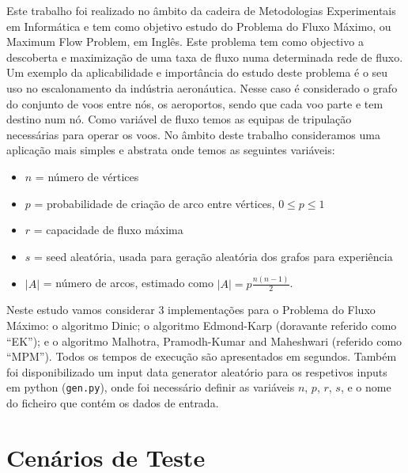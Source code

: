 \documentclass{uofa-eng-assignment}
\begin{document}
Este trabalho foi realizado no âmbito da cadeira de Metodologias Experimentais em Informática e tem como objetivo estudo do Problema do Fluxo Máximo, ou Maximum Flow Problem, em Inglês. Este problema tem como objectivo a descoberta e maximização de uma taxa de fluxo numa determinada rede de fluxo. Um exemplo da aplicabilidade e importância do estudo deste problema é o seu uso no escalonamento da indústria aeronáutica. Nesse caso é considerado o grafo do conjunto de voos entre nós, os aeroportos, sendo que cada voo parte e tem destino num nó. Como variável de fluxo temos as equipas de tripulação necessárias para operar os voos.
No âmbito deste trabalho consideramos uma aplicação mais simples e abstrata onde temos as seguintes variáveis:
\begin{itemize}
\item $n$ = número de vértices
\item $p$ = probabilidade de criação de arco entre vértices, $0 \leq p \leq 1$
\item $r$ = capacidade de fluxo máxima
\item $s$ = seed aleatória, usada para geração aleatória dos grafos para experiência
\item $|A|$ = número de arcos, estimado como $|A|=p\frac{n(n-1)}{2}$.
\end{itemize}
Neste estudo vamos considerar 3 implementações para o Problema do Fluxo Máximo: o algoritmo Dinic; o algoritmo Edmond-Karp (doravante referido como ``EK''); e o algoritmo Malhotra, Pramodh-Kumar and Maheshwari (referido como ``MPM'').
Todos os tempos de execução são apresentados em segundos.
Também foi disponibilizado um input data generator aleatório para os respetivos inputs em python (\texttt{gen.py}), onde foi necessário definir as variáveis $n$, $p$, $r$, $s$, e o nome do ficheiro que contém os dados de entrada.

\section{Cenários de Teste }
\end{document}
